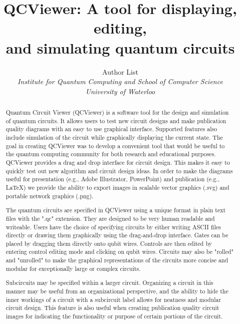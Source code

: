 \documentclass[10pt]{article}
\theoremstyle{definition}
\begin{document}
\title{\bf QCViewer: A tool for displaying, editing, \\ and simulating quantum circuits}

\author{%
Author List  \\
  \it \small Institute for Quantum Computing and School of Computer Science \\  \it \small University of Waterloo
}

\date{}

\maketitle

\begin{abstract}
Quantum Circuit Viewer (QCViewer) is a software tool for the design and simulation of quantum circuits. It allows users to test new circuit designs and make publication quality diagrams with an easy to use graphical interface. Supported features also include simulation of the circuit while graphically displaying the current state. The goal in creating QCViewer was to develop a convenient tool that would be useful to the quantum computing community for both research and educational purposes. QCViewer provides a drag and drop interface for circuit design. This makes it easy to quickly test out new algorithm and circuit design ideas. In order to make the diagrams useful for presentation (e.g., Adobe Illustrator, PowerPoint) and publication (e.g., \LaTeX) we provide the ability to export images in scalable vector graphics (.svg) and portable network graphics (.png). 

The quantum circuits are specified in QCViewer using a unique format in plain text files with the ".qc" extension. They are designed to be very human readable and writeable. Users have the choice of specifying circuits by either writing ASCII files directly or drawing them graphically using the drag-and-drop interface. Gates can be placed by dragging them directly onto qubit wires. Controls are then edited by entering control editing mode and clicking on qubit wires. Circuits may also be "rolled" and "unrolled" to make the graphical representations of the circuits more concise and modular for exceptionally large or complex circuits. 

Subcircuits may be specified within a larger circuit. Organizing a circuit in this manner may be useful from an organizational perspective, and the ability to hide the inner workings of a circuit with a subcircuit label allows for neatness and modular circuit design. This feature is also useful when creating publication quality circuit images for indicating the functionality or purpose of certain portions of the circuit. 


\end{abstract}
\end{document}
